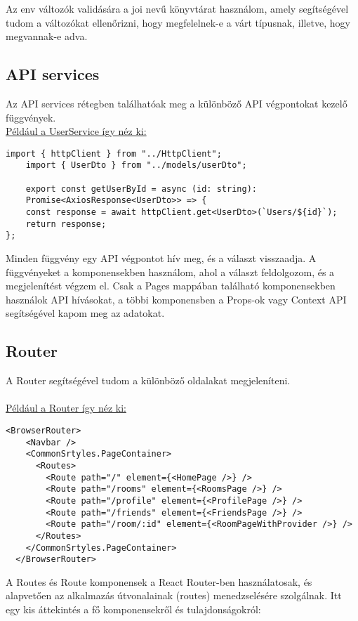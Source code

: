 \vspace{1em}
Az env változók validására a joi \cite[]{joi} nevű könyvtárat használom, amely segítségével tudom a változókat ellenőrizni, hogy megfelelnek-e a várt típusnak, illetve, hogy megvannak-e adva.

\subsection*{API services}
Az API services rétegben találhatóak meg a különböző API végpontokat kezelő függvények.
\\
\underline{Például a UserService így néz ki:}
\begin{lstlisting}[style=es6,caption={User Service}]
    import { httpClient } from "../HttpClient";
    import { UserDto } from "../models/userDto";
    
    export const getUserById = async (id: string):
    Promise<AxiosResponse<UserDto>> => {
    const response = await httpClient.get<UserDto>(`Users/${id}`);
    return response;
};

\end{lstlisting}
\vspace{1em}
Minden függvény egy API végpontot hív meg, és a választ visszaadja.
A függvényeket a komponensekben használom, ahol a választ feldolgozom, és a megjelenítést végzem el.
Csak a Pages mappában található komponensekben használok API hívásokat, a többi komponensben a Props-ok vagy Context API segítségével kapom meg az adatokat.
\subsection*{Router}
A Router segítségével tudom a különböző oldalakat megjeleníteni.
\\
\\
\underline{Például a Router így néz ki:}
\begin{lstlisting}[style=es6,caption={Router}]
    <BrowserRouter>
    <Navbar />
    <CommonSrtyles.PageContainer>
      <Routes>
        <Route path="/" element={<HomePage />} />
        <Route path="/rooms" element={<RoomsPage />} />
        <Route path="/profile" element={<ProfilePage />} />
        <Route path="/friends" element={<FriendsPage />} />
        <Route path="/room/:id" element={<RoomPageWithProvider />} />
      </Routes>
    </CommonSrtyles.PageContainer>
  </BrowserRouter>
\end{lstlisting}
\vspace{1em}
A Routes és Route komponensek a React Router-ben használatosak, és alapvetően az alkalmazás útvonalainak (routes) menedzselésére szolgálnak. Itt egy kis áttekintés a fő komponensekről és tulajdonságokról:
